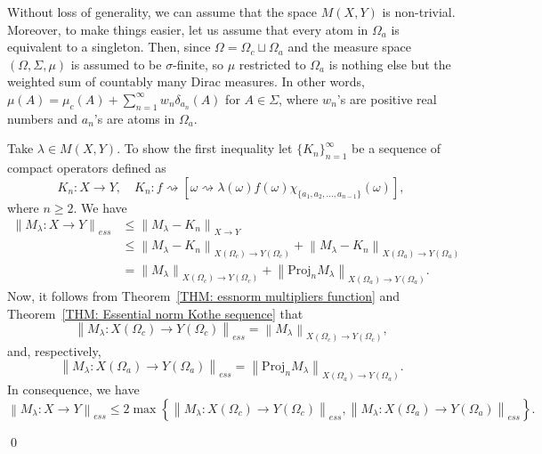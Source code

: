 \documentclass[11pt]{amsart}
\theoremstyle{definition}
\theoremstyle{definition}
\theoremstyle{definition}
\theoremstyle{definition}
\theoremstyle{definition}
\theoremstyle{definition}
\theoremstyle{definition}
\theoremstyle{definition}
\numberwithin{equation}{section}
\numberwithin{equation}{section}
\numberwithin{equation}{section}
\theoremstyle{definition}
\theoremstyle{definition}
\theoremstyle{definition}
\theoremstyle{definition}
\theoremstyle{definition}
\theoremstyle{definition}
\newcommand{\norm}[1]{\left\lVert#1\right\rVert}
\renewenvironment{proof}{\noindent {\bf Proof.}}{\qed}
\begin{document}
\begin{proof}
	Without loss of generality, we can assume that the space $M(X,Y)$ is non-trivial.
	Moreover, to make things easier, let us assume that every atom in $\Omega_a$ is equivalent to a singleton.
	Then, since $\Omega = \Omega_c \sqcup \Omega_a$ and the measure space $(\Omega,\Sigma,\mu)$ is assumed to be $\sigma$-finite,
	so $\mu$ restricted to $\Omega_a$ is nothing else but the weighted sum of countably many Dirac measures.
	In other words, $\mu(A) = \mu_c(A) + \sum_{n=1}^{\infty} w_n \delta_{a_n}(A)$ for $A \in \Sigma$,
	where $w_n$'s are positive real numbers and $a_n$'s are atoms in $\Omega_a$.
	
	Take $\lambda \in M(X,Y)$.
	To show the first inequality let $\{K_n\}_{n=1}^{\infty}$ be a sequence of compact operators defined as
	\begin{equation*}
		K_n \colon X \rightarrow Y, \quad
		K_n \colon f \rightsquigarrow \left[ \omega \rightsquigarrow \lambda(\omega) f(\omega) \chi_{\{ a_1,a_2,..., a_{n-1} \}}(\omega) \right],
	\end{equation*}
	where $n \geqslant 2$. We have
	\begin{align*}
		\norm{M_{\lambda} \colon X \rightarrow Y}_{ess} & \leqslant \norm{M_{\lambda} - K_n}_{X \rightarrow Y} \\
			& \leqslant \norm{M_{\lambda} - K_n}_{X(\Omega_c) \rightarrow Y(\Omega_c)} + \norm{M_{\lambda} - K_n}_{X(\Omega_a) \rightarrow Y(\Omega_a)} \\
			& = \norm{M_{\lambda}}_{X(\Omega_c) \rightarrow Y(\Omega_c)} + \norm{\text{Proj}_n M_{\lambda}}_{X(\Omega_a) \rightarrow Y(\Omega_a)}.
	\end{align*}
	Now, it follows from Theorem~\ref{THM: essnorm multipliers function} and Theorem~\ref{THM: Essential norm Kothe sequence} that
	\begin{equation*}
		\norm{M_{\lambda} \colon X(\Omega_c) \rightarrow Y(\Omega_c)}_{ess} = \norm{M_{\lambda}}_{X(\Omega_c) \rightarrow Y(\Omega_c)},
	\end{equation*}
	and, respectively,
	\begin{equation*}
		\norm{M_{\lambda} \colon X(\Omega_a) \rightarrow Y(\Omega_a)}_{ess}
			= \norm{\text{Proj}_n M_{\lambda}}_{X(\Omega_a) \rightarrow Y(\Omega_a)}.
	\end{equation*}
	In consequence, we have
	\begin{equation*}
		\norm{M_{\lambda} \colon X \rightarrow Y}_{ess}
			\leqslant 2\max \left\{ \norm{M_{\lambda} \colon X(\Omega_c) \rightarrow Y(\Omega_c)}_{ess}, \norm{M_{\lambda} \colon X(\Omega_a) \rightarrow Y(\Omega_a)}_{ess} \right\}.
	\end{equation*}


\end{proof}
\end{document}
